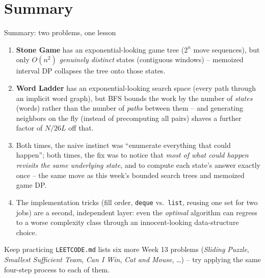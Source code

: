 \documentclass[11pt,aspectratio=169]{beamer}
\begin{document}
\section{Summary}

\begin{frame}{Summary: two problems, one lesson}
  \footnotesize
  \begin{enumerate}
    \item \textbf{Stone Game} has an exponential-looking game tree ($2^n$ move
    sequences), but only $O(n^2)$ \emph{genuinely distinct} states (contiguous
    windows) -- memoized interval DP collapses the tree onto those states.
    \item \textbf{Word Ladder} has an exponential-looking search space (every path
    through an implicit word graph), but BFS bounds the work by the number of
    \emph{states} (words) rather than the number of \emph{paths} between them --
    and generating neighbors on the fly (instead of precomputing all pairs) shaves a
    further factor of $N/26L$ off that.
    \item Both times, the naive instinct was ``enumerate everything that could
    happen''; both times, the fix was to notice that \emph{most of what could happen
    revisits the same underlying state}, and to compute each state's answer exactly
    once -- the same move as this week's bounded search trees and memoized game DP.
    \item The implementation tricks (fill order, \texttt{deque} vs.\ \texttt{list},
    reusing one set for two jobs) are a second, independent layer: even the
    \emph{optimal} algorithm can regress to a worse complexity class through an
    innocent-looking data-structure choice.
  \end{enumerate}
  \begin{alertblock}{Keep practicing}
    \texttt{LEETCODE.md} lists six more Week 13 problems (\emph{Sliding Puzzle},
    \emph{Smallest Sufficient Team}, \emph{Can I Win}, \emph{Cat and Mouse}, \dots) --
    try applying the same four-step process to each of them.
  \end{alertblock}
\end{frame}
\end{document}
